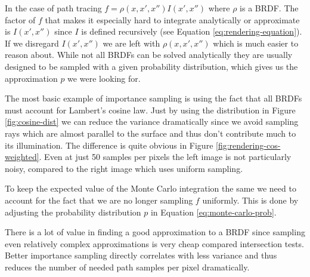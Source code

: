 \documentclass{ACGSeminar}
\begin{document}
In the case of path tracing $f = \rho(x,x',x'')I(x',x'')$ where $\rho$ is a BRDF. The factor of $f$ that makes it especially hard to integrate analytically or approximate is $I(x',x'')$ since $I$ is defined recursively (see Equation \eqref{eq:rendering-equation}). If we disregard $I(x',x'')$ we are left with $\rho(x,x',x'')$ which is much easier to reason about. While not all BRDFs can be solved analytically \cite{Montes2012} they are usually designed to be sampled with a given probability distribution, which gives us the approximation $p$ we were looking for. 


The most basic example of importance sampling is using the fact that all BRDFs must account for Lambert's cosine law. Just by using the distribution in Figure \ref{fig:cosine-dist} we can reduce the variance dramatically since we avoid sampling rays which are almost parallel to the surface and thus don't contribute much to its illumination. The difference is quite obvious in Figure \ref{fig:rendering-cos-weighted}. Even at just 50 samples per pixels the left image is not particularly noisy, compared to the right image which uses uniform sampling.

To keep the expected value of the Monte Carlo integration the same we need to account for the fact that we are no longer sampling $f$ uniformly. This is done by adjusting the probability distribution $p$ in Equation \eqref{eq:monte-carlo-prob}.

There is a lot of value in finding a good approximation to a BRDF since sampling even relatively complex approximations is very cheap compared intersection tests. Better importance sampling directly correlates with less variance and thus reduces the number of needed path samples per pixel dramatically.
\end{document}
